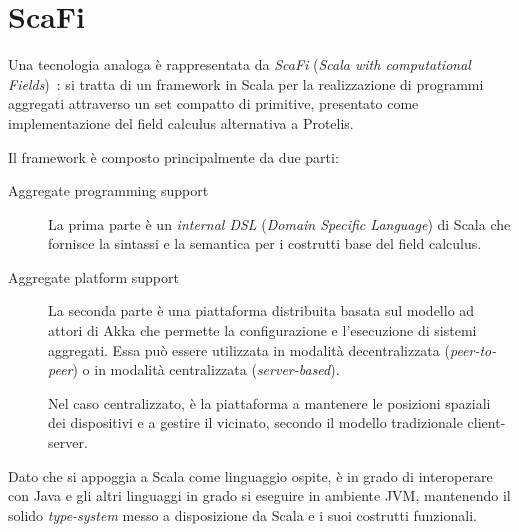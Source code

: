 \section{ScaFi}\label{sec:scafi}

Una tecnologia analoga è rappresentata da \emph{ScaFi} (\emph{\emph{Sca}la with computational \emph{Fi}elds})~\cite{aggregatescala-pmldc2016}:
si tratta di un framework in Scala per la realizzazione di programmi aggregati attraverso un set compatto di primitive, presentato come implementazione del field calculus alternativa a Protelis.

Il framework è composto principalmente da due parti:

\begin{description}
  \item[Aggregate programming support]
    La prima parte è un \emph{internal DSL} (\emph{Domain Specific Language}) di Scala che fornisce la sintassi e la semantica per i costrutti base del field calculus.

  \item[Aggregate platform support]
    La seconda parte è una piattaforma distribuita basata sul modello ad attori di Akka che permette la configurazione e l'esecuzione di sistemi aggregati.
    Essa può essere utilizzata in modalità decentralizzata (\emph{peer-to-peer}) %
    o in modalità centralizzata (\emph{server-based}).%



    Nel caso centralizzato, è la piattaforma a mantenere le posizioni spaziali dei dispositivi e a gestire il vicinato, secondo il modello tradizionale client-server.
\end{description}

Dato che si appoggia a Scala come linguaggio ospite, è in grado di interoperare con Java e gli altri linguaggi in grado si eseguire in ambiente JVM, mantenendo il solido \emph{type-system} messo a disposizione da Scala e i suoi costrutti funzionali.
